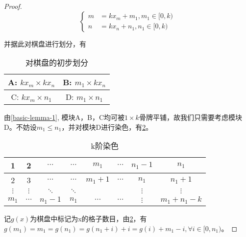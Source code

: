 \begin{proof}
    $$
        \left\{
        \begin{aligned}
            m & =  kx_m + m_1, m_1 \in [0, k) \\
            n & =  kx_n + n_1, n_1 \in [0, k)
        \end{aligned}
        \right.
    $$

    并据此对棋盘进行划分，有

    \begin{table}[h]
        \centering
        \caption{对棋盘的初步划分}
        \begin{tabular}{|c|c|}

            \hline
            A: $kx_m \times kx_n$ & B: $m_1 \times kx_n$ \\
            \hline
            C: $kx_m \times n_1$  & D: $m_1 \times n_1$  \\
            \hline
        \end{tabular}
        \label{fig:first-picture}
    \end{table}

    由\ref*{basic-lemma-1}, 模块A，B，C均可被$1 \times k$骨牌平铺，故我们只需要考虑模块D。不妨设$m_1 \le n_1$，并对模块D进行染色，有\ref*{fig:k-order-staining-example}。

    \begin{table}[ht]
        \centering
        \caption{k阶染色}
        \begin{tabular}{|c|c|c|c|c|c|c|c|}
            \hline
            1        & 2        & $\cdots$ & $\cdots$ & $m_1$     & $\cdots$ & $n_1 - 1$ & $n_1$          \\
            \hline
            2        & 3        & $\cdots$ & $\cdots$ & $m_1 + 1$ & $\cdots$ & $n_1$     & $n_1 + 1$      \\
            \hline
            $\vdots$ & $\vdots$ & $\ddots$ & $\ddots$ &           &          & $\vdots$  & $\vdots$       \\
            \hline
            $m_1$    & $\cdots$ & $n_1-1$  & $n_1$    & $\cdots$  & $\cdots$ & $\vdots$  & $m_1 + n_1 -k$ \\
            \hline
        \end{tabular}
        \label{fig:k-order-staining-example}
    \end{table}


    记$g(x)$为棋盘中标记为x的格子数目，由\ref*{fig:k-order-staining-example}，有$g(m_1) = m_1 = g(n_1) = g(n_1 + i) + i = g(i) + m_1 - i, \forall i \in [0, n_1)$。


\end{proof}
